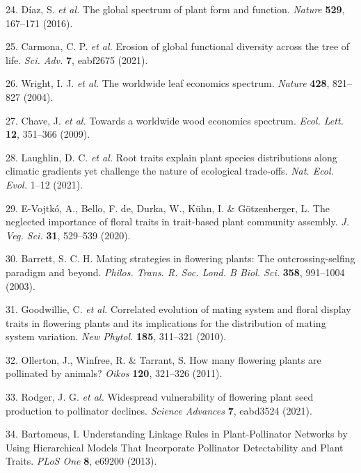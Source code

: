 \documentclass[12pt,a4paper,]{article}
\begin{document}
\hypertarget{ref-diaz2016}{}
24. Díaz, S. \emph{et al.} The global spectrum of plant form and
function. \emph{Nature} \textbf{529}, 167--171 (2016).

\hypertarget{ref-carmona2021}{}
25. Carmona, C. P. \emph{et al.} Erosion of global functional diversity
across the tree of life. \emph{Sci. Adv.} \textbf{7}, eabf2675 (2021).

\hypertarget{ref-wright2004}{}
26. Wright, I. J. \emph{et al.} The worldwide leaf economics spectrum.
\emph{Nature} \textbf{428}, 821--827 (2004).

\hypertarget{ref-chave2009}{}
27. Chave, J. \emph{et al.} Towards a worldwide wood economics spectrum.
\emph{Ecol. Lett.} \textbf{12}, 351--366 (2009).

\hypertarget{ref-laughlin2021}{}
28. Laughlin, D. C. \emph{et al.} Root traits explain plant species
distributions along climatic gradients yet challenge the nature of
ecological trade-offs. \emph{Nat. Ecol. Evol.} 1--12 (2021).

\hypertarget{ref-evojtko2020}{}
29. E-Vojtkó, A., Bello, F. de, Durka, W., Kühn, I. \& Götzenberger, L.
The neglected importance of floral traits in trait-based plant community
assembly. \emph{J. Veg. Sci.} \textbf{31}, 529--539 (2020).

\hypertarget{ref-barrett2003}{}
30. Barrett, S. C. H. Mating strategies in flowering plants: The
outcrossing-selfing paradigm and beyond. \emph{Philos. Trans. R. Soc.
Lond. B Biol. Sci.} \textbf{358}, 991--1004 (2003).

\hypertarget{ref-goodwillie2010}{}
31. Goodwillie, C. \emph{et al.} Correlated evolution of mating system
and floral display traits in flowering plants and its implications for
the distribution of mating system variation. \emph{New Phytol.}
\textbf{185}, 311--321 (2010).

\hypertarget{ref-ollerton2011}{}
32. Ollerton, J., Winfree, R. \& Tarrant, S. How many flowering plants
are pollinated by animals? \emph{Oikos} \textbf{120}, 321--326 (2011).

\hypertarget{ref-rodger2021}{}
33. Rodger, J. G. \emph{et al.} Widespread vulnerability of flowering
plant seed production to pollinator declines. \emph{Science Advances}
\textbf{7}, eabd3524 (2021).

\hypertarget{ref-bartomeus2013}{}
34. Bartomeus, I. Understanding Linkage Rules in Plant-Pollinator
Networks by Using Hierarchical Models That Incorporate Pollinator
Detectability and Plant Traits. \emph{PLoS One} \textbf{8}, e69200
(2013).
\end{document}
